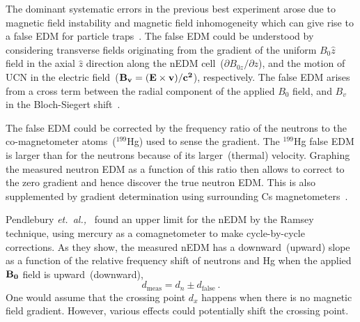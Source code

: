 The dominant systematic errors in the previous best experiment arose
due to magnetic field instability
and magnetic field inhomogeneity which can give rise to a false EDM
for particle traps~\cite{pendlebury2004}.
The false EDM could be understood by considering transverse fields
originating from the gradient of the uniform $B_0 \hat{z}$ field in
the axial $\hat{z}$ direction along the nEDM
cell~($\partial{B_{0z}}/\partial{z}$), and the motion of UCN in the
electric field~($\bf{B_v} =(\bf{E} \times \bf{v})/c^2 $),
respectively.
The false EDM arises from a cross term
between the radial component of the applied $B_0$ field, and $B_v$ in
the Bloch-Siegert shift~\cite{pendlebury2004}.







The false EDM could be corrected by the frequency ratio of the
neutrons to the co-magnetometer atoms~($^{199}$Hg) used to sense the
gradient. The $^{199}$Hg false EDM is larger than for the neutrons
because of its larger~(thermal) velocity.  Graphing the measured
neutron EDM as a function of this ratio then allows to correct to the
zero gradient and hence discover the true neutron EDM. This is also
supplemented by gradient determination using surrounding Cs
magnetometers~\cite{afach2015measurement}.


Pendlebury {\it{et.~al.,}}~\cite{Pendlebury2015} found an upper limit
for the nEDM by the Ramsey technique, using mercury as a
comagnetometer to make cycle-by-cycle corrections.  As they show, the
measured nEDM has a downward~(upward) slope as a function of the
relative frequency shift of neutrons and Hg when the applied
$\bf{B_0}$ field is upward~(downward),
\begin{equation}
  d_{\mathrm {meas}}= d_n \pm d_{\mathrm{false}}~.
\end{equation}
One would assume that the crossing point $d_x$ happens when there is
no magnetic field gradient. However, various effects could potentially
shift the crossing point.


